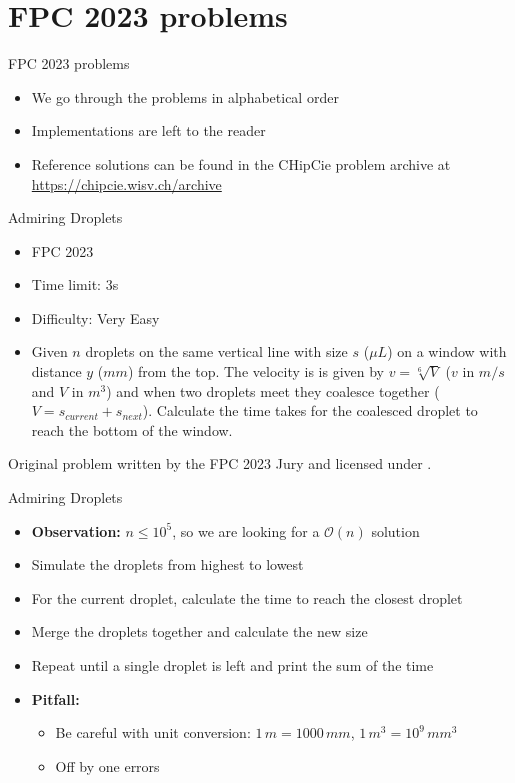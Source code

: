 \documentclass[11pt,pdf, aspectratio=169]{beamer}
\begin{document}
  \section{FPC 2023 problems}\label{sec:fpc-2023-problems}
  \begin{frame}{FPC 2023 problems}
    \begin{itemize}
      \item We go through the problems in alphabetical order
      \item Implementations are left to the reader
      \item Reference solutions can be found in the CHipCie problem archive at \url{https://chipcie.wisv.ch/archive}
    \end{itemize}
  \end{frame}
  \begin{frame}{Admiring Droplets}
    \begin{itemize}
      \item FPC 2023
      \item Time limit: 3s
      \item Difficulty: Very Easy
      \item Given $n$ droplets on the same vertical line with size $s$ ($\mu L$) on a window with distance $y$ ($mm$) from the top.
      The velocity is is given by $v = \sqrt[6]{V}$ ($v$ in $m/s$ and $V$ in $m^3$) and when two droplets meet they coalesce together ($V=s_{current}+s_{next}$).
      Calculate the time takes for the coalesced droplet to reach the bottom of the window.
    \end{itemize}
    Original problem written by the FPC 2023 Jury and licensed under \doclicenseLongNameRef.

    \doclicenseImage

  \end{frame}
  \begin{frame}{Admiring Droplets}
    \begin{itemize}
      \item<1-> \textbf{Observation:} $n \leq 10^5$, so we are looking for a $\mathcal{O}(n)$ solution
      \item<2-> Simulate the droplets from highest to lowest
      \item<3-> For the current droplet, calculate the time to reach the closest droplet
      \item<4-> Merge the droplets together and calculate the new size
      \item<4-> Repeat until a single droplet is left and print the sum of the time
      \item<4-> \textbf{Pitfall:} \begin{itemize}
                                    \item Be careful with unit conversion: $1\,m = 1000\,mm$, $1\,m^3=10^{9}\,mm^3$
                                    \item Off by one errors
      \end{itemize}
    \end{itemize}
  \end{frame}
\end{document}
